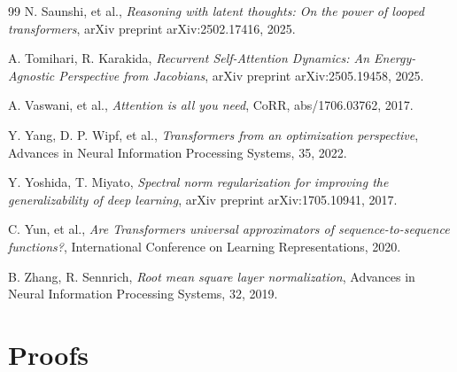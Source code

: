 \documentclass{zapiski}
\theoremstyle{plain}
\theoremstyle{definition}
\theoremstyle{remark}
\begin{document}
\begin{thebibliography}{99}
N. Saunshi, et al., \emph{Reasoning with latent thoughts: On the power of looped transformers}, arXiv preprint arXiv:2502.17416, 2025.

A. Tomihari, R. Karakida, \emph{Recurrent Self-Attention Dynamics: An Energy-Agnostic Perspective from Jacobians}, arXiv preprint arXiv:2505.19458, 2025.

A. Vaswani, et al., \emph{Attention is all you need}, CoRR, abs/1706.03762, 2017.

Y. Yang, D. P. Wipf, et al., \emph{Transformers from an optimization perspective}, Advances in Neural Information Processing Systems, 35, 2022.

Y. Yoshida, T. Miyato, \emph{Spectral norm regularization for improving the generalizability of deep learning}, arXiv preprint arXiv:1705.10941, 2017.

C. Yun, et al., \emph{Are Transformers universal approximators of sequence-to-sequence functions?}, International Conference on Learning Representations, 2020.

B. Zhang, R. Sennrich, \emph{Root mean square layer normalization}, Advances in Neural Information Processing Systems, 32, 2019.

\end{thebibliography}



\newpage
\appendix
\section{Proofs}
\label{app:proofs}
\end{document}
